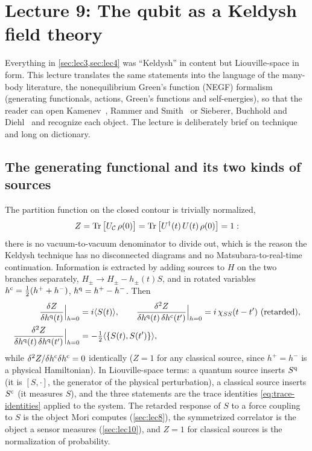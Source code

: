 \section{Lecture 9: The qubit as a Keldysh field theory}
\label{sec:lec9}

Everything in \cref{sec:lec3,sec:lec4} was ``Keldysh'' in content but Liouville-space in form.
This lecture translates the same statements into the language of the many-body literature, the nonequilibrium Green's function (NEGF) formalism (generating functionals, actions, Green's functions and self-energies), so that the reader can open Kamenev~\cite{Kamenev2011}, Rammer and Smith~\cite{RammerSmith1986} or Sieberer, Buchhold and Diehl~\cite{Sieberer2016} and recognize each object.
The lecture is deliberately brief on technique and long on dictionary.

\subsection{The generating functional and its two kinds of sources}

The partition function on the closed contour is trivially normalized,
\begin{equation}
  Z=\operatorname{Tr}\big[U_{\mathcal C}\,\rho(0)\big]=\operatorname{Tr}\big[U^\dagger(t)\,U(t)\,\rho(0)\big]=1 :
\end{equation}
there is no vacuum-to-vacuum denominator to divide out, which is the reason the Keldysh technique has no disconnected diagrams and no Matsubara-to-real-time continuation.
Information is extracted by adding sources to $H$ on the two branches separately, $H_\pm\to H_\pm-h_\pm(t)S$, and in rotated variables $h^{\mathrm{c}}=\tfrac12(h^++h^-)$, $h^{\mathrm{q}}=h^+-h^-$.
Then
\begin{equation}
\begin{aligned}
  \frac{\delta Z}{\delta h^{\mathrm{q}}(t)}\Big|_{h=0}&=i\langle S(t)\rangle,\qquad
  \frac{\delta^2Z}{\delta h^{\mathrm{q}}(t)\,\delta h^{\mathrm{c}}(t')}\Big|_{h=0}=i\,\chi_{SS}(t-t')\ \text{(retarded)},\\
  \frac{\delta^2Z}{\delta h^{\mathrm{q}}(t)\,\delta h^{\mathrm{q}}(t')}\Big|_{h=0}&=-\tfrac12\langle\{S(t),S(t')\}\rangle,
\end{aligned}
\end{equation}
while $\delta^2Z/\delta h^{\mathrm{c}}\delta h^{\mathrm{c}}=0$ identically ($Z=1$ for any classical source, since $h^+=h^-$ is a physical Hamiltonian).
In Liouville-space terms: a quantum source inserts $S^{\mathrm{q}}$ (it is $[S,\cdot]$, the generator of the physical perturbation), a classical source inserts $S^{\mathrm{c}}$ (it measures $S$), and the three statements are the trace identities \eqref{eq:trace-identities} applied to the system.
The retarded response of $S$ to a force coupling to $S$ is the object Mori computes (\cref{sec:lec8}), the symmetrized correlator is the object a sensor measures (\cref{sec:lec10}), and $Z=1$ for classical sources is the normalization of probability.

